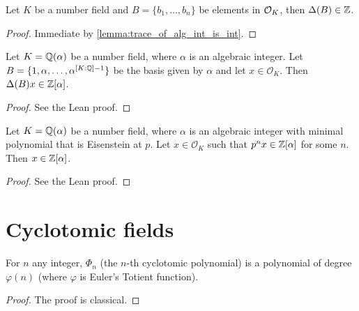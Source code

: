 \begin{lemma}\label{lemma:int_basis_int_disc}
	\leanok
	Let $K$ be a number field and $B=\{b_1,\dots,b_n\}$ be elements in $\mathcal{O}_K$, then $\Delta(B) \in \mathbb{Z}$.
\end{lemma}
\begin{proof}
	\leanok
	Immediate by \ref{lemma:trace_of_alg_int_is_int}.
\end{proof}


\begin{lemma}\label{lemma:disc_int_basis}
	\leanok
	Let $K = \mathbb{Q}(\alpha)$ be a number field, where $\alpha$ is an algebraic integer. Let $B = \{1, \alpha, \ldots, \alpha^{[K : \mathbb{Q}] - 1} \}$ be the basis given by $\alpha$ and let $x \in \mathcal{O}_K$. Then $\Delta(B)x \in \mathbb{Z}[\alpha]$.
\end{lemma}

\begin{proof}
	\leanok
	See the Lean proof.
\end{proof}

\begin{lemma}\label{lemma:eis_crit_and_alg_ints}
	\leanok
	Let $K = \mathbb{Q}(\alpha)$ be a number field, where $\alpha$ is an algebraic integer with minimal polynomial that is Eisenstein at $p$. Let $x \in \mathcal{O}_K$ such that $p^n x \in \mathbb{Z}[\alpha]$ for some $n$. Then $x \in \mathbb{Z}[\alpha]$.
\end{lemma}
\begin{proof}
	\leanok
	See the Lean proof.
\end{proof}

\section{Cyclotomic fields}

\begin{lemma}\label{lemma:cyclo_poly_deg}
	\leanok
	For $n$ any integer, $\Phi_n$ (the $n$-th cyclotomic polynomial) is a polynomial of degree $\varphi(n)$ (where $\varphi$ is Euler's Totient function).
\end{lemma}
\begin{proof}
	\leanok
	The proof is classical.
\end{proof}


